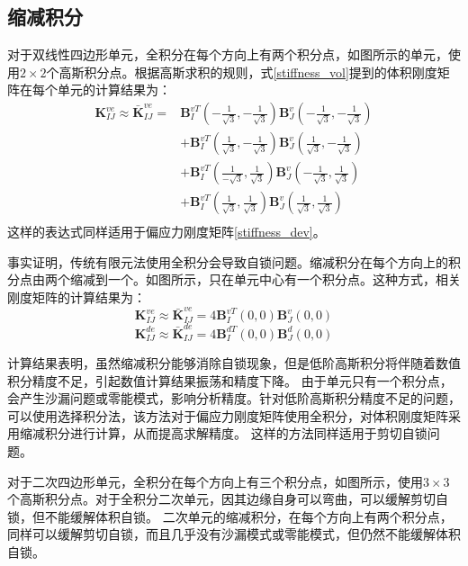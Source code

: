 \subsection{缩减积分}
对于双线性四边形单元，全积分在每个方向上有两个积分点，如图所示的单元，使用$2\times2$个高斯积分点。根据高斯求积的规则，式\eqref{stiffness_vol}提到的体积刚度矩阵在每个单元的计算结果为：
\begin{equation}
    \begin{split}
        \boldsymbol K^{ve}_{IJ} \approx \bar{\boldsymbol K}^{ve}_{IJ} = & \boldsymbol B^{vT}_I(-\frac{1}{\sqrt{3}},-\frac{1}{\sqrt{3}}) \boldsymbol B_J^v(-\frac{1}{\sqrt{3}},-\frac{1}{\sqrt{3}}) \\
        & + \boldsymbol B^{vT}_I(\frac{1}{\sqrt{3}},-\frac{1}{\sqrt{3}}) \boldsymbol B_J^v(\frac{1}{\sqrt{3}},-\frac{1}{\sqrt{3}})\\
        & + \boldsymbol B^{vT}_I(\frac{1}{-\sqrt{3}},\frac{1}{\sqrt{3}}) \boldsymbol B_J^v(-\frac{1}{\sqrt{3}},\frac{1}{\sqrt{3}})\\
        & + \boldsymbol B^{vT}_I(\frac{1}{\sqrt{3}},\frac{1}{\sqrt{3}}) \boldsymbol B_J^v(\frac{1}{\sqrt{3}},\frac{1}{\sqrt{3}})\\
    \end{split}
\end{equation}
这样的表达式同样适用于偏应力刚度矩阵\eqref{stiffness_dev}。

事实证明，传统有限元法使用全积分会导致自锁问题。缩减积分在每个方向上的积分点由两个缩减到一个。如图所示，只在单元中心有一个积分点。这种方式，相关刚度矩阵的计算结果为：
\begin{equation}
        \boldsymbol K^{ve}_{IJ} \approx \bar{\boldsymbol K}^{ve}_{IJ} = 4\boldsymbol B^{vT}_I(0,0) \boldsymbol B_J^v(0,0)
\end{equation}
\begin{equation}
    \boldsymbol K^{de}_{IJ} \approx \bar{\boldsymbol K}^{de}_{IJ} = 4\boldsymbol B^{dT}_I(0,0) \boldsymbol B_J^d(0,0)
\end{equation}

计算结果表明，虽然缩减积分能够消除自锁现象，但是低阶高斯积分将伴随着数值积分精度不足，引起数值计算结果振荡和精度下降。
由于单元只有一个积分点，会产生沙漏问题或零能模式，影响分析精度。针对低阶高斯积分精度不足的问题，可以使用选择积分法，该方法对于偏应力刚度矩阵使用全积分，对体积刚度矩阵采用缩减积分进行计算，从而提高求解精度。
这样的方法同样适用于剪切自锁问题。

对于二次四边形单元，全积分在每个方向上有三个积分点，如图所示，使用$3\times3$个高斯积分点。对于全积分二次单元，因其边缘自身可以弯曲，可以缓解剪切自锁，但不能缓解体积自锁。
二次单元的缩减积分，在每个方向上有两个积分点，同样可以缓解剪切自锁，而且几乎没有沙漏模式或零能模式，但仍然不能缓解体积自锁。

